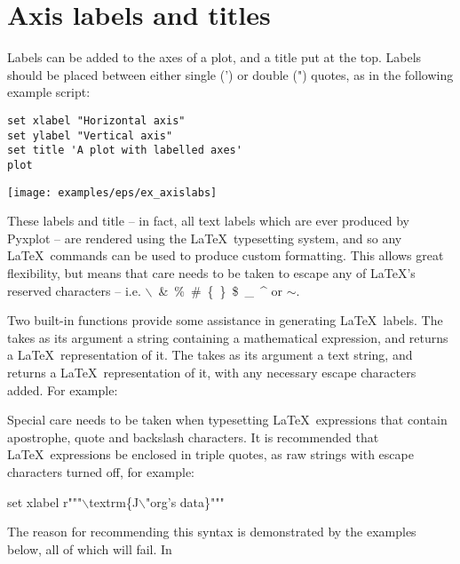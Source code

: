 \section{Axis labels and titles}
\label{sec:latex_incompatibility}

Labels can be added to the axes of a plot, and a title put at the top.  Labels
should be placed between either single (') or double (") quotes, as in the
following example script:

\begin{verbatim}
set xlabel "Horizontal axis"
set ylabel "Vertical axis"
set title 'A plot with labelled axes'
plot
\end{verbatim}

\begin{center}
\texttt{[image: examples/eps/ex\_axislabs]}
\end{center}

\noindent These labels and title -- in fact, all text labels which are ever
produced by Pyxplot -- are rendered using the \LaTeX\ typesetting system, and
so any \LaTeX\ commands can be used to produce custom formatting. This allows
great flexibility, but means that care needs to be taken to escape any of
\LaTeX's reserved characters -- i.e. $\backslash$~\&~\%~\#~\{~\}~\$~\_~\^{} or
$\sim$.

Two built-in functions provide some assistance in generating \LaTeX\ labels.
The  takes as its argument a string containing a mathematical
expression, and returns a \LaTeX\ representation of it.  The
 takes as its argument a text string, and returns a
\LaTeX\ representation of it, with any necessary escape characters added. For
example:

\vspace{3mm}

\vspace{3mm}

Special care needs to be taken when typesetting \LaTeX\ expressions that
contain apostrophe, quote and backslash characters.  It is recommended that
\LaTeX\ expressions be enclosed in triple quotes, as raw strings with escape
characters turned off, for example:

\begin{dodo}
set xlabel r"""$\backslash$textrm\{J$\backslash$"org's data\}"""
\end{dodo}

The reason for recommending this syntax is demonstrated by the examples below,
all of which will fail. In


